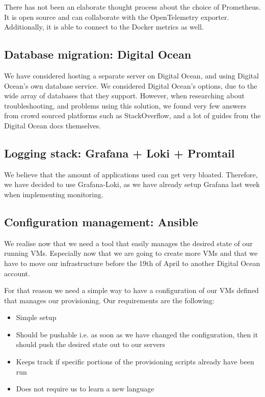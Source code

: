 There has not been an elaborate thought process about the choice of Prometheus. It is open source and can collaborate with the OpenTelemetry exporter. Additionally, it is able to connect to the Docker metrics as well.

\subsection{Database migration: Digital Ocean}

We have considered hosting a separate server on Digital Ocean, and using Digital Ocean's own database service. We considered Digital Ocean's options, due to the wide array of databases that they support. However, when researching about troubleshooting, and problems using this solution, we found very few answers from crowd sourced platforms such as StackOverflow, and a lot of guides from the Digital Ocean docs themselves.

\subsection{Logging stack: Grafana + Loki + Promtail}

We believe that the amount of applications used can get very bloated. Therefore, we have decided to use Grafana-Loki, as we have already setup Grafana last week when implementing monitoring.

\subsection{Configuration management: Ansible}

We realise now that we need a tool that easily manages the desired state of our running VMs. Especially now that we are going to create more VMs and that we have to move our infrastructure before the 19th of April to another Digital Ocean account.

For that reason we need a simple way to have a configuration of our VMs defined that manages our provisioning. Our requirements are the following:

\begin{itemize}
    \item Simple setup
    \item Should be pushable i.e. as soon as we have changed the configuration, then it should push the desired state out to our servers
    \item Keeps track if specific portions of the provisioning scripts already have been run
    \item Does not require us to learn a new language
\end{itemize}

